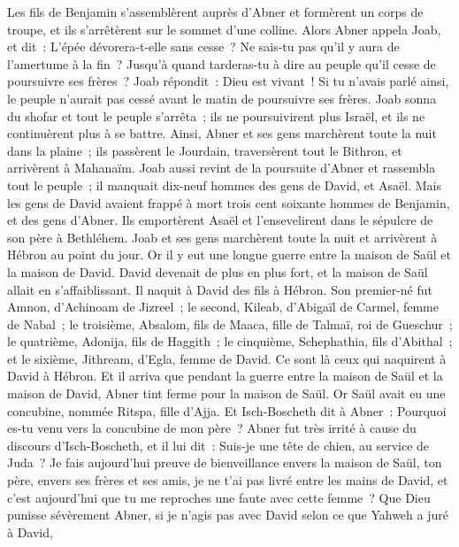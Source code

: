 \begin{multicols}{2}
Les fils de Benjamin s'assemblèrent auprès d'Abner et formèrent un corps de troupe, et ils s'arrêtèrent sur le sommet d'une colline.
Alors Abner appela Joab, et dit~: L'épée dévorera-t-elle sans cesse~? Ne sais-tu pas qu'il y aura de l'amertume à la fin~? Jusqu'à quand tarderas-tu à dire au peuple qu'il cesse de poursuivre ses frères~?
Joab répondit~: Dieu est vivant~! Si tu n'avais parlé ainsi, le peuple n'aurait pas cessé avant le matin de poursuivre ses frères.
Joab sonna du shofar et tout le peuple s'arrêta~; ils ne poursuivirent plus Israël, et ils ne continuèrent plus à se battre.
Ainsi, Abner et ses gens marchèrent toute la nuit dans la plaine~; ils passèrent le Jourdain, traversèrent tout le Bithron, et arrivèrent à Mahanaïm.
Joab aussi revint de la poursuite d'Abner et rassembla tout le peuple~; il manquait dix-neuf hommes des gens de David, et Asaël.
Mais les gens de David avaient frappé à mort trois cent soixante hommes de Benjamin, et des gens d'Abner.
Ils emportèrent Asaël et l'ensevelirent dans le sépulcre de son père à Bethléhem. Joab et ses gens marchèrent toute la nuit et arrivèrent à Hébron au point du jour.
\VerseOne{}Or il y eut une longue guerre entre la maison de Saül et la maison de David. David devenait de plus en plus fort, et la maison de Saül allait en s'affaiblissant.
Il naquit à David des fils à Hébron. Son premier-né fut Amnon, d'Achinoam de Jizreel~;
le second, Kileab, d'Abigaïl de Carmel, femme de Nabal~; le troisième, Absalom, fils de Maaca, fille de Talmaï, roi de Gueschur~;
le quatrième, Adonija, fils de Haggith~; le cinquième, Schephathia, fils d'Abithal~;
et le sixième, Jithream, d'Egla, femme de David. Ce sont là ceux qui naquirent à David à Hébron.
Et il arriva que pendant la guerre entre la maison de Saül et la maison de David, Abner tint ferme pour la maison de Saül.
Or Saül avait eu une concubine, nommée Ritspa, fille d'Ajja. Et Isch-Boscheth dit à Abner~: Pourquoi es-tu venu vers la concubine de mon père~?
Abner fut très irrité à cause du discours d'Isch-Boscheth, et il lui dit~: Suis-je une tête de chien, au service de Juda~? Je fais aujourd'hui preuve de bienveillance envers la maison de Saül, ton père, envers ses frères et ses amis, je ne t'ai pas livré entre les mains de David, et c'est aujourd'hui que tu me reproches une faute avec cette femme~?
Que Dieu punisse sévèrement Abner, si je n'agis pas avec David selon ce que Yahweh a juré à David,

\end{multicols}
